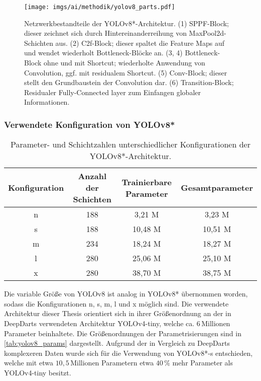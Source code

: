 \begin{figure}
    \centering
    \texttt{[image: imgs/ai/methodik/yolov8\_parts.pdf]}
    \caption{Netzwerkbestandteile der YOLOv8*-Architektur. (1) SPPF-Block; dieser zeichnet sich durch Hintereinanderreihung von MaxPool2d-Schichten aus. (2) C2f-Block; dieser spaltet die Feature Maps auf und wendet wiederholt Bottleneck-Blöcke an. (3, 4) Bottleneck-Block ohne und mit Shortcut; wiederholte Anwendung von Convolution, ggf. mit residualem Shortcut. (5) Conv-Block; dieser stellt den Grundbaustein der Convolution dar. (6) Transition-Block; Residualer Fully-Connected layer zum Einfangen globaler Informationen.}
    \label{img:yolov8_parts}
\end{figure}

\subsubsection{Verwendete Konfiguration von YOLOv8*}
\label{sec:yolov8_konfiguration}

\begin{table}[t]
    \begin{tabular}{c||c|c|c}
        Konfiguration & Anzahl der Schichten & Trainierbare Parameter & Gesamtparameter \\ \hline
        n             & 188                  & 3,21 M                 & 3,23 M          \\
        s             & 188                  & 10,48 M                & 10,51 M         \\
        m             & 234                  & 18,24 M                & 18,27 M         \\
        l             & 280                  & 25,06 M                & 25,10 M         \\
        x             & 280                  & 38,70 M                & 38,75 M
    \end{tabular}
    \caption{Parameter- und Schichtzahlen unterschiedlicher Konfigurationen der YOLOv8*-Architektur.}
    \label{tab:yolov8_params}
\end{table}

Die variable Größe von YOLOv8 ist analog in YOLOv8* übernommen worden, sodass die Konfigurationen n, s, m, l und x möglich sind. Die verwendete Architektur dieser Thesis orientiert sich in ihrer Größenordnung an der in DeepDarts verwendeten Architektur YOLOv4-tiny, welche ca. $6\,\text{Millionen}$ Parameter beinhaltete. Die Größenordnungen der Parametrisierungen sind in \autoref{tab:yolov8_params} dargestellt. Aufgrund der in Vergleich zu DeepDarts komplexeren Daten wurde sich für die Verwendung von YOLOv8*-s entschieden, welche mit etwa $10,5\,\text{Millionen}$ Parametern etwa $40\,\%$ mehr Parameter als YOLOv4-tiny besitzt.

